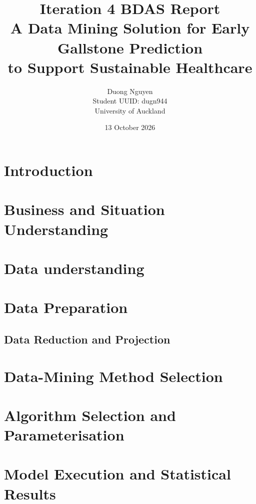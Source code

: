 \documentclass[a4paper]{article}
\title{
    \textbf{Iteration 4 BDAS Report}\\[0.4cm]
    \large A Data Mining Solution for Early Gallstone Prediction\\
    to Support Sustainable Healthcare
}
\author{
    Duong Nguyen\\
    Student UUID: dugn944\\
    University of Auckland
}
\date{13 October 2026}
\begin{document}
\maketitle
\tableofcontents
\newpage

\section{Introduction}


\section{Business and Situation Understanding}
\label{sec:business-understanding}


\section{Data understanding}
\label{sec:data-understanding}


\section{Data Preparation}
\label{sec:data-preparation}


\subsection{Data Reduction and Projection}
\label{sec:data-reduction}


\section{Data-Mining Method Selection}
\label{sec:dm-method-selection}


\section{Algorithm Selection and Parameterisation}
\label{sec:algorithm-selection}


\section{Model Execution and Statistical Results}
\label{sec:model-building}

\end{document}
